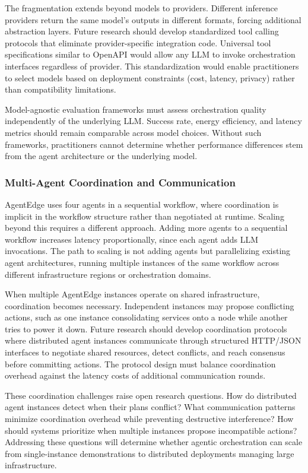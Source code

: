 The fragmentation extends beyond models to providers. Different inference providers return the same model's outputs in different formats, forcing additional abstraction layers. Future research should develop standardized tool calling protocols that eliminate provider-specific integration code. Universal tool specifications similar to \ac{OpenAPI} would allow any \ac{LLM} to invoke orchestration interfaces regardless of provider. This standardization would enable practitioners to select models based on deployment constraints (cost, latency, privacy) rather than compatibility limitations.

Model-agnostic evaluation frameworks must assess orchestration quality independently of the underlying \ac{LLM}. Success rate, energy efficiency, and latency metrics should remain comparable across model choices. Without such frameworks, practitioners cannot determine whether performance differences stem from the agent architecture or the underlying model.

\subsubsection{Multi-Agent Coordination and Communication}
\label{subsubsec:ch6_multiagent_coordination}

\ac{AgentEdge} uses four agents in a sequential workflow, where coordination is implicit in the workflow structure rather than negotiated at runtime. Scaling beyond this requires a different approach. Adding more agents to a sequential workflow increases latency proportionally, since each agent adds \ac{LLM} invocations. The path to scaling is not adding agents but parallelizing existing agent architectures, running multiple instances of the same workflow across different infrastructure regions or orchestration domains.

When multiple \ac{AgentEdge} instances operate on shared infrastructure, coordination becomes necessary. Independent instances may propose conflicting actions, such as one instance consolidating services onto a node while another tries to power it down. Future research should develop coordination protocols where distributed agent instances communicate through structured \ac{HTTP}/\ac{JSON} interfaces to negotiate shared resources, detect conflicts, and reach consensus before committing actions. The protocol design must balance coordination overhead against the latency costs of additional communication rounds.

These coordination challenges raise open research questions. How do distributed agent instances detect when their plans conflict? What communication patterns minimize coordination overhead while preventing destructive interference? How should systems prioritize when multiple instances propose incompatible actions? Addressing these questions will determine whether agentic orchestration can scale from single-instance demonstrations to distributed deployments managing large infrastructure.

